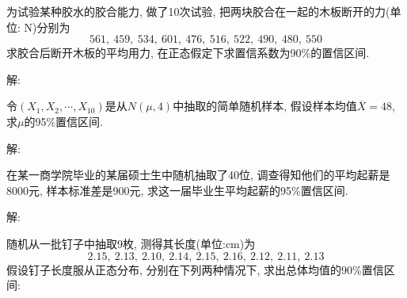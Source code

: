 \documentclass[standard]{ExBook}
\begin{document}
\begin{qitems}
    \begin{bbox}
    \begin{shaded}
        \qitem 
为试验某种胶水的胶合能力, 做了10次试验, 把两块胶合在一起的木板断开的力(单位: N)分别为
$$561,\ 459,\ 534,\ 601,\ 476,\ 516,\ 522,\ 490,\ 480,\ 550$$
求胶合后断开木板的平均用力, 在正态假定下求置信系数为90\%的置信区间.
    \end{shaded}
    \end{bbox}

\vspace{-5em}

    \begin{bbox}
解: 
    \end{bbox}

\vspace{-5em}

    \begin{bbox}
    \begin{shaded}
        \qitem
令$(X_1,X_2,\cdots,X_{10})$是从$N(\mu,4)$中抽取的简单随机样本, 假设样本均值$\overline{X}=48$, 求$\mu$的95\%置信区间.
    \end{shaded}
    \end{bbox}

\vspace{-5em}

    \begin{bbox}
解: 
    \end{bbox}

\vspace{-5em}

    \begin{bbox}
    \begin{shaded}
        \qitem
在某一商学院毕业的某届硕士生中随机抽取了40位, 调查得知他们的平均起薪是8000元, 样本标准差是900元, 求这一届毕业生平均起薪的95\%置信区间.
    \end{shaded}
    \end{bbox}

\vspace{-5em}

    \begin{bbox}
解: 
    \end{bbox}

\vspace{-5em}

    \begin{bbox}
    \begin{shaded}
        \qitem
随机从一批钉子中抽取9枚, 测得其长度(单位:cm)为
$$2.15,\ 2.13,\ 2.10,\ 2.14,\ 2.15,\ 2.16,\ 2.12,\ 2.11,\ 2.13$$
假设钉子长度服从正态分布, 分别在下列两种情况下, 求出总体均值的90\%置信区间:


\end{shaded}
\end{bbox}
\end{qitems}
\end{document}
